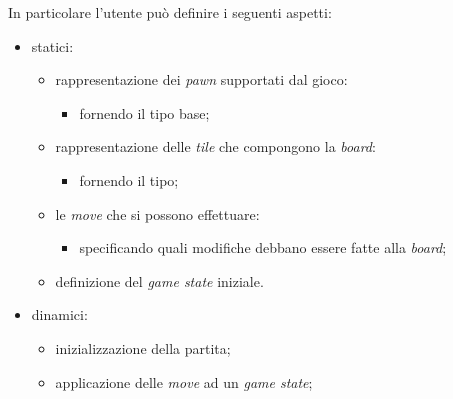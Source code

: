 In particolare l'utente può definire i seguenti aspetti:

\begin{itemize}
    \item statici:
    \begin{itemize}
        \item rappresentazione dei \textit{pawn} supportati dal gioco:
        \begin{itemize}
            \item fornendo il tipo base;
        \end{itemize}
        \item rappresentazione delle \textit{tile} che compongono la \textit{board}:
        \begin{itemize}
            \item fornendo il tipo;
        \end{itemize}
        \item le \textit{move} che si possono effettuare:
        \begin{itemize}
            \item specificando quali modifiche debbano essere fatte alla \textit{board};
        \end{itemize}
        \item definizione del \textit{game state} iniziale.
    \end{itemize}

    \item dinamici:
    \begin{itemize}
        \item inizializzazione della partita;
        \item applicazione delle \textit{move} ad un \textit{game state};
    \end{itemize}
\end{itemize}


